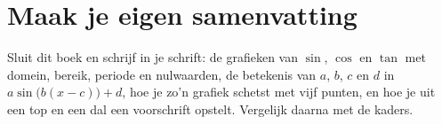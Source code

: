 \begin{oefeningen}






\end{oefeningen}


\ifzelfstudie
\section*{Maak je eigen samenvatting}
Sluit dit boek en schrijf in je schrift: de grafieken van $\sin$, $\cos$ en $\tan$ met domein, bereik, periode en nulwaarden, de betekenis van $a$, $b$, $c$ en $d$ in $a\sin\bigl(b(x - c)\bigr) + d$, hoe je zo'n grafiek schetst met vijf punten, en hoe je uit een top en een dal een voorschrift opstelt. Vergelijk daarna met de kaders.
\fi
